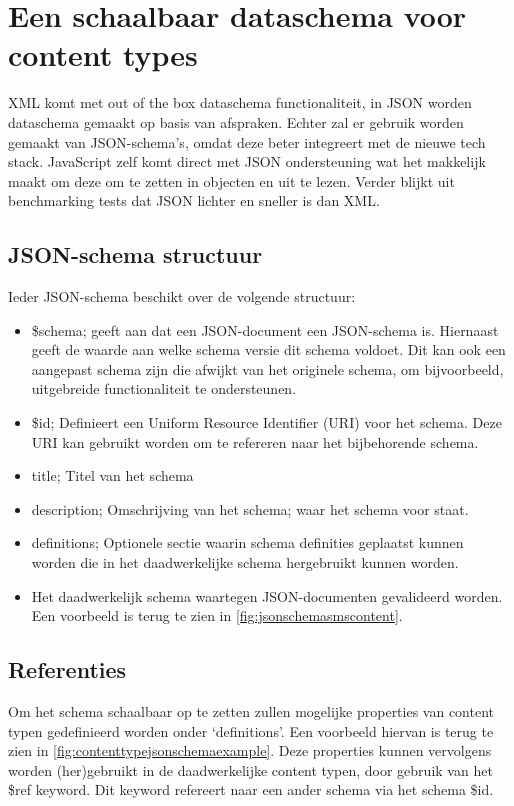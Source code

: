 \pagebreak
\section{Een schaalbaar dataschema voor content types}
XML komt met out of the box dataschema functionaliteit, in JSON worden dataschema gemaakt op basis van afspraken. Echter zal er gebruik worden gemaakt van JSON-schema’s, omdat deze beter integreert met de nieuwe tech stack. JavaScript zelf komt direct met JSON ondersteuning wat het makkelijk maakt om deze om te zetten in objecten en uit te lezen. Verder blijkt uit benchmarking tests dat JSON lichter en sneller is dan XML\cite{Nurseitov}. 

\subsection{JSON-schema structuur}
Ieder JSON-schema beschikt over de volgende structuur:
\begin{itemize}
    \item \$schema; geeft aan dat een JSON-document een JSON-schema is. Hiernaast geeft de waarde aan welke schema versie dit schema voldoet\cite{Droettboom2016}. Dit kan ook een aangepast schema zijn die afwijkt van het originele schema, om bijvoorbeeld, uitgebreide functionaliteit te ondersteunen.
    \item \$id; Definieert een Uniform Resource Identifier (URI) voor het schema. Deze URI kan gebruikt worden om te refereren naar het bijbehorende schema.
    \item title; Titel van het schema
    \item description; Omschrijving van het schema; waar het schema voor staat.
    \item definitions; Optionele sectie waarin schema definities geplaatst kunnen worden die in het daadwerkelijke schema hergebruikt kunnen worden\cite{FoundationsJSONSchema}.
    \item Het daadwerkelijk schema waartegen JSON-documenten gevalideerd worden. Een voorbeeld is terug te zien in \autoref{fig:jsonschemasmscontent}.
\end{itemize}

\subsection{Referenties}
Om het schema schaalbaar op te zetten zullen mogelijke properties van content typen gedefinieerd worden onder ‘definitions’. Een voorbeeld hiervan is terug te zien in \autoref{fig:contenttypejsonschemaexample}. Deze properties kunnen vervolgens worden (her)gebruikt in de daadwerkelijke content typen, door gebruik van het \$ref keyword\cite{Droettboom2016}. Dit keyword refereert naar een ander schema via het schema \$id.

